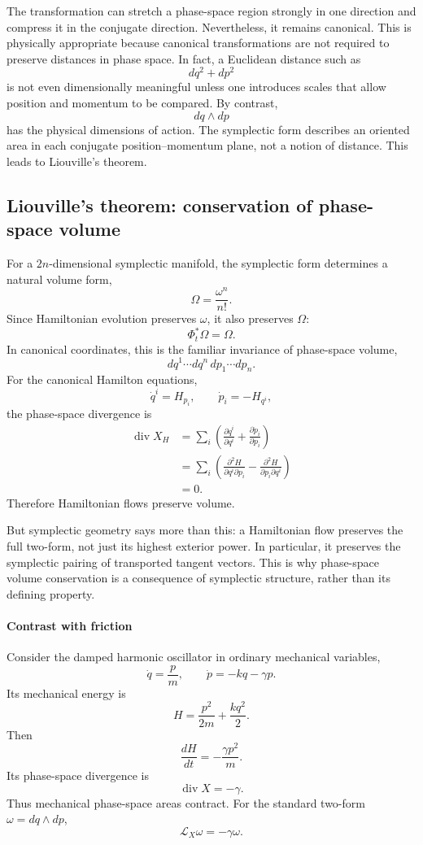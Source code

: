 The transformation can stretch a phase-space region strongly in one direction
and compress it in the conjugate direction. Nevertheless, it remains canonical.
This is physically appropriate because canonical transformations are not
required to preserve distances in phase space. In fact, a Euclidean distance
such as \[ dq^2+dp^2 \] is not even dimensionally meaningful unless one
introduces scales that allow position and momentum to be compared. By contrast,
\[ dq\wedge dp \] has the physical dimensions of action. The symplectic form
describes an oriented area in each conjugate position–momentum plane, not a
notion of distance. This leads to Liouville's theorem.

\subsection{ Liouville's theorem: conservation of phase-space volume}
For a \(2n\)-dimensional symplectic manifold, the symplectic form determines a
natural volume form,
\[
\boxed{
\Omega=\frac{\omega^n}{n!}.
}
\]
Since Hamiltonian evolution preserves \(\omega\), it also preserves \(\Omega\):
\[
\boxed{\Phi_t^*\Omega=\Omega.}
\]
In canonical coordinates, this is the familiar invariance of phase-space volume,
\[
dq^1\cdots dq^n\,dp_1\cdots dp_n.
\]
For the canonical Hamilton equations,
\[
\dot q^i=H_{p_i},\qquad
\dot p_i=-H_{q^i},
\]
the phase-space divergence is
\[
\begin{aligned}
\operatorname{div}X_H
&=\sum_i\left(
\frac{\partial\dot q^i}{\partial q^i}
+\frac{\partial\dot p_i}{\partial p_i}
\right)\\
&=\sum_i\left(
\frac{\partial^2H}{\partial q^i\partial p_i}
-\frac{\partial^2H}{\partial p_i\partial q^i}
\right)\\
&=0.
\end{aligned}
\]
Therefore Hamiltonian flows preserve volume.

But symplectic geometry says more than this: a Hamiltonian flow preserves the
full two-form, not just its highest exterior power. In particular, it preserves
the symplectic pairing of transported tangent vectors. This is why phase-space
volume conservation is a consequence of symplectic structure, rather than its
defining property.

\paragraph{Contrast with friction}
Consider the damped harmonic oscillator in ordinary mechanical variables,
\[
\dot q=\frac pm,\qquad
\dot p=-kq-\gamma p.
\]
Its mechanical energy is
\[
H=\frac{p^2}{2m}+\frac{kq^2}{2}.
\]
Then
\[
\frac{dH}{dt}=-\frac{\gamma p^2}{m}.
\]
Its phase-space divergence is
\[
\operatorname{div}X=-\gamma.
\]
Thus mechanical phase-space areas contract.
For the standard two-form \(\omega=dq\wedge dp\),
\[
\boxed{\mathcal L_X\omega=-\gamma\omega.}
\]

